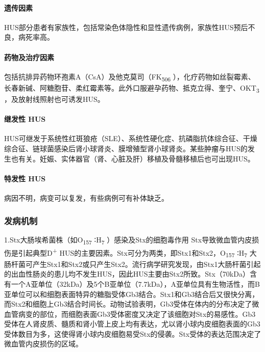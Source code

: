 \paragraph{遗传因素}

HUS部分患者有家族性，包括常染色体隐性和显性遗传病例，家族性HUS预后不良，病死率高。

\paragraph{药物及治疗因素}

包括抗排异药物环孢素A（CsA）及他克莫司（FK\textsubscript{506}
），化疗药物如丝裂霉素、长春新碱、阿糖胞苷、柔红霉素等。此外口服避孕药物、抵克立得、奎宁、OKT\textsubscript{3}
，及放射线照射也可诱发HUS。

\paragraph{继发性 HUS}

HUS可继发于系统性红斑狼疮（SLE）、系统性硬化症、抗磷脂抗体综合征、干燥综合征、链球菌感染后肾小球肾炎、膜增殖型肾小球肾炎。某些肿瘤与HUS的发生也有关。妊娠、实体器官（肾、心脏及肝）移植及骨髓移植后也可出现HUS。

\paragraph{特发性 HUS}

病因不明，病变可以复发，有些病例可有补体缺乏。

\subsubsection{发病机制}

1.Stx大肠埃希菌株（如O\textsubscript{157} ∶H\textsubscript{7}
）感染及Stx的细胞毒作用
Stx导致微血管内皮损伤是引起典型D\textsuperscript{+}
HUS的主要因素。Stx可分为两类，即Stx1和Stx2，O\textsubscript{157}
∶H\textsubscript{7}
大肠杆菌可产生Stx1和Stx2或只产生Stx2。流行病学研究发现，由Stx1大肠杆菌引起的出血性肠炎的患儿均不发生HUS，因此HUS主要由Stx2所致。Stx（70kDa）含有一个A亚单位（32kDa）及5个B亚单位（7.7kDa），A亚单位具有生物活性，而B亚单位可以和细胞表面特异的糖脂受体Gb3结合。Stx1和Gb3结合后又很快分离，而Stx2和细胞上Gb3结合时间长。动物试验表明，Gb3受体在体内的分布决定了微血管病变的部位，而细胞表面Gb3受体密度又决定了该细胞对Stx的易感性。Gb3受体在人肾皮质、髓质和肾小管上皮上均有表达，尤以肾小球内皮细胞表面的Gb3受体数目为多，这使得肾小球内皮细胞易受Stx的侵袭。Stx受体的表达范围决定了微血管内皮损伤的区域。

